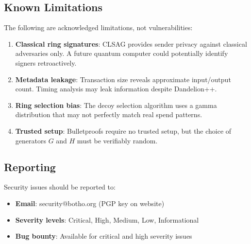 \subsection{Known Limitations}

The following are acknowledged limitations, not vulnerabilities:

\begin{enumerate}
  \item \textbf{Classical ring signatures}: CLSAG provides sender privacy
    against classical adversaries only. A future quantum computer could
    potentially identify signers retroactively.

  \item \textbf{Metadata leakage}: Transaction size reveals approximate
    input/output count. Timing analysis may leak information despite
    Dandelion++.

  \item \textbf{Ring selection bias}: The decoy selection algorithm uses
    a gamma distribution that may not perfectly match real spend patterns.

  \item \textbf{Trusted setup}: Bulletproofs require no trusted setup, but
    the choice of generators $G$ and $H$ must be verifiably random.
\end{enumerate}

\subsection{Reporting}

Security issues should be reported to:

\begin{itemize}
  \item \textbf{Email}: security@botho.org (PGP key on website)
  \item \textbf{Severity levels}: Critical, High, Medium, Low, Informational
  \item \textbf{Bug bounty}: Available for critical and high severity issues
\end{itemize}
